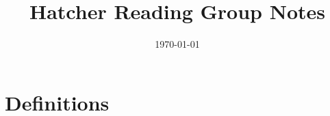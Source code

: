\documentclass[a4paper,10pt]{article}
\title{Hatcher Reading Group Notes}
\date{\today}
\begin{document}
\maketitle
\section*{Definitions}

\end{document}

